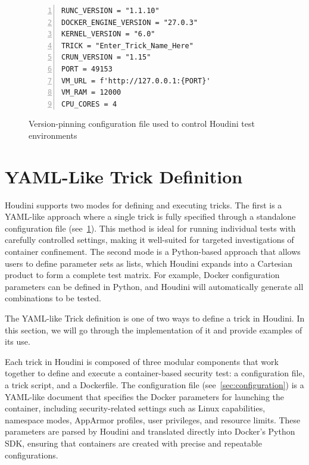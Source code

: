 \documentclass[12pt]{report}
\begin{document}
\begin{doublespace}
\begin{figure}[H]
\caption{Version-pinning configuration file used to control Houdini test environments}
\label{fig:version-pinning-configuration-implementation}
\begin{lstlisting}[caption={}, numbers=left, numberstyle=\tiny, stepnumber=1, breaklines=true, frame=single, backgroundcolor=\color{gray!10}, basicstyle=\ttfamily\scriptsize, showspaces=false, showstringspaces=false]
RUNC_VERSION = "1.1.10"
DOCKER_ENGINE_VERSION = "27.0.3"
KERNEL_VERSION = "6.0"
TRICK = "Enter_Trick_Name_Here"
CRUN_VERSION = "1.15"
PORT = 49153
VM_URL = f'http://127.0.0.1:{PORT}'
VM_RAM = 12000
CPU_CORES = 4
\end{lstlisting}
\end{figure}

\section{YAML-Like Trick Definition}
\label{sec:yaml-trick}

Houdini supports two modes for defining and executing tricks. The first is a YAML-like approach where a single trick is fully specified through a standalone configuration file (see~\ref{fig:version-pinning-configuration-implementation}). This method is ideal for running individual tests with carefully controlled settings, making it well-suited for targeted investigations of container confinement. The second mode is a Python-based approach that allows users to define parameter sets as lists, which Houdini expands into a Cartesian product to form a complete test matrix. For example, Docker configuration parameters can be defined in Python, and Houdini will automatically generate all combinations to be tested.

The YAML-like Trick definition is one of two ways to define a trick in Houdini. In this section, we will go through the implementation of it and provide examples of its use.

Each trick in Houdini is composed of three modular components that work together to define and execute a container-based security test: a configuration file, a trick script, and a Dockerfile. The configuration file (see~\ref{sec:configuration}) is a YAML-like document that specifies the Docker parameters for launching the container, including security-related settings such as Linux capabilities, namespace modes, AppArmor profiles, user privileges, and resource limits. These parameters are parsed by Houdini and translated directly into Docker's Python SDK, ensuring that containers are created with precise and repeatable configurations.


\end{doublespace}
\end{document}
